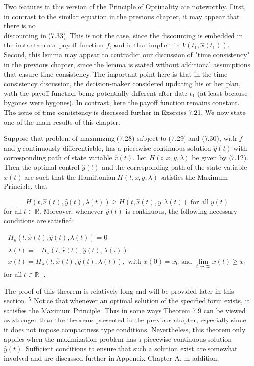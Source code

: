 \documentclass[\topdir/lecture_notes.tex]{subfiles}
\begin{document}
Two features in this version of the Principle of Optimality are noteworthy. First, in contrast to the similar equation in the previous chapter, it may appear that there is no\\
discounting in (7.33). This is not the case, since the discounting is embedded in the instantaneous payoff function $f$, and is thus implicit in $V\left(t_{1}, \hat{x}\left(t_{1}\right)\right)$. Second, this lemma may appear to contradict our discussion of "time consistency" in the previous chapter, since the lemma is stated without additional assumptions that ensure time consistency. The important point here is that in the time consistency discussion, the decision-maker considered updating his or her plan, with the payoff function being potentially different after date $t_1$ (at least because bygones were bygones). In contrast, here the payoff function remains constant. The issue of time consistency is discussed further in Exercise 7.21. We now state one of the main results of this chapter.

\begin{theorem}
Suppose that problem of maximizing (7.28) subject to (7.29) and (7.30), with $f$ and $g$ continuously differentiable, has a piecewise continuous solution $\hat{y}(t)$ with corresponding path of state variable $\hat{x}(t)$. Let $H(t, x, y, \lambda)$ be given by (7.12). Then the optimal control $\hat{y}(t)$ and the corresponding path of the state variable $\hat{x}(t)$ are such that the Hamiltonian $H(t, x, y, \lambda)$ satisfies the Maximum Principle, that

\[
H(t, \hat{x}(t), \hat{y}(t), \lambda(t)) \geq H(t, \hat{x}(t), y, \lambda(t)) \text { for all } y(t)
\]
for all $t \in \mathbb{R}$. Moreover, whenever $\hat{y}(t)$ is continuous, the following necessary conditions are satisfied:

\[
\begin{gathered}
H_{y}(t, \hat{x}(t), \hat{y}(t), \lambda(t))=0 \\
\dot{\lambda}(t)=-H_{x}(t, \hat{x}(t), \hat{y}(t), \lambda(t)) \\
\dot{x}(t)=H_{\lambda}(t, \hat{x}(t), \hat{y}(t), \lambda(t)), \text { with } x(0)=x_{0} \text { and } \lim _{t \rightarrow \infty} x(t) \geq x_{1}
\end{gathered}
\]
for all $t \in \mathbb{R}_{+}$.
\end{theorem}
The proof of this theorem is relatively long and will be provided later in this section. ${ }^{5}$ Notice that whenever an optimal solution of the specified form exists, it satisfies the Maximum Principle. Thus in some ways Theorem 7.9 can be viewed as stronger than the theorems presented in the previous chapter, especially since it does not impose compactness type conditions. Nevertheless, this theorem only applies when the maximization problem has a piecewise continuous solution $\hat{y}(t)$. Sufficient conditions to ensure that such a solution exist are somewhat involved and are discussed further in Appendix Chapter A. In addition,
\end{document}
